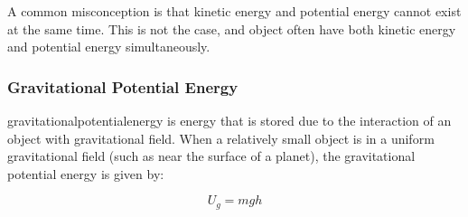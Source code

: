 	A common misconception is that kinetic energy and potential energy cannot exist at the same time.  This is not the case, and object often have both kinetic energy and potential energy simultaneously.

	\subsubsection{Gravitational Potential Energy}   
	\gls{gravitationalpotentialenergy} is energy that is stored due to the interaction of an object with gravitational field.  When a relatively small object is in a uniform gravitational field (such as near the surface of a planet), the gravitational potential energy is given by: 
			\begin{mdframed}[backgroundcolor=orange!20!white]
		\begin{equation}
		U_g = mgh
		\label{eqn:gravitationalpotentialenergy}
		\end{equation}
	\end{mdframed}
	
